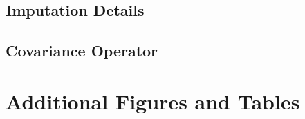 \subsection{Imputation Details}


\subsection{Covariance Operator}

%
%
%


\section{Additional Figures and Tables}\label{app:additional}

